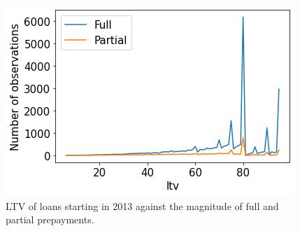         \begin{figure}
            \centering
            \includegraphics[width=0.6\linewidth]{Figures/LTV againts Full and Partial prepayments.png}
            \caption{LTV of loans starting in 2013 against the magnitude of full and partial prepayments.}
            \label{model_LTV_against_prepayment}
        \end{figure}
    

